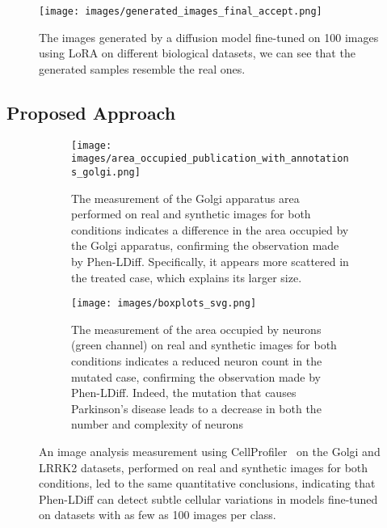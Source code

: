 \begin{figure}

  \centering
  \texttt{[image: images/generated\_images\_final\_accept.png]} %
  \caption{ The images generated by a diffusion model fine-tuned on 100 images using LoRA on different biological datasets, we can see that the generated samples resemble the real ones. }


  \label{fig:domain_adapt}
\end{figure}


\subsection{Proposed Approach}
\begin{figure}[h]
  \centering
  \begin{subfigure}{\linewidth}
    \centering
    \texttt{[image: images/area\_occupied\_publication\_with\_annotations\_golgi.png]} %
    \caption{The measurement of the Golgi apparatus area performed on real and synthetic images for both conditions indicates a difference in the area occupied by the Golgi apparatus, confirming the observation made by Phen-LDiff. Specifically, it appears more scattered in the treated case, which explains its larger size.}
    \label{fig:subfigure1}
  \end{subfigure}

  \vspace{0.5cm} %


  \begin{subfigure}{\linewidth}
    \centering
    \texttt{[image: images/boxplots\_svg.png]} %
    \caption{The measurement of the area occupied by neurons (green channel) on real and synthetic images for both conditions indicates a reduced neuron count in the mutated case, confirming the observation made by Phen-LDiff. Indeed, the mutation that causes Parkinson's disease leads to a decrease in both the number and complexity of neurons}
    \label{fig:subfigure2}
  \end{subfigure}

  \caption{An image analysis measurement using CellProfiler~\cite{cellprofiler} on the Golgi and LRRK2 datasets, performed on real and synthetic images for both conditions, led to the same quantitative conclusions, indicating that Phen-LDiff can detect subtle cellular variations in models fine-tuned on datasets with as few as 100 images per class.}
  \label{fig:boxplots}
\end{figure}




